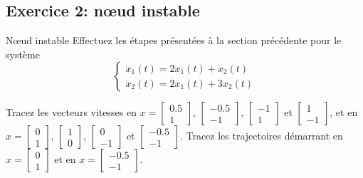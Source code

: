         \subsection{Exercice 2: nœud instable}
            \begin{exercise}{Nœud instable}
                Effectuez les étapes présentées à la section précédente pour le système
                \begin{equation}
                    \begin{cases}
                        \dot{x}_1(t) = 2 x_1(t) + x_2(t)\\
                        \dot{x}_2(t) = 2 x_1(t) + 3 x_2(t)
                    \end{cases}
                \end{equation}
            \end{exercise}
            Tracez les vecteurs vitesses en $x = \begin{bmatrix}0.5 \\ 1\end{bmatrix}$, $\begin{bmatrix}-0.5 \\ -1\end{bmatrix}$, $\begin{bmatrix}-1 \\ 1\end{bmatrix}$ et $\begin{bmatrix}1 \\ -1\end{bmatrix}$, et en $x = \begin{bmatrix}0 \\ 1\end{bmatrix}$, $\begin{bmatrix}1 \\ 0\end{bmatrix}$, $\begin{bmatrix}0 \\ -1\end{bmatrix}$ et $\begin{bmatrix}-0.5 \\ -1\end{bmatrix}$. Tracez les trajectoires démarrant en $x = \begin{bmatrix}0 \\ 1\end{bmatrix}$ et en $x = \begin{bmatrix}-0.5 \\ -1\end{bmatrix}$.
